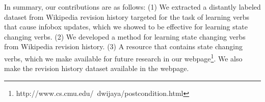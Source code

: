 In summary, our contributions are as follows: (1) We  extracted a  distantly labeled dataset from Wikipedia revision history targeted for the task of  learning verbs that cause  infobox updates, which we showed to be effective for learning state changing verbs.  (2) We developed a method for learning state changing verbs from Wikipedia revision history.
(3) A resource that contains state changing verbs, which we make available for future research in our webpage\footnote{http://www.cs.cmu.edu/~dwijaya/postcondition.html}. We also make the revision history dataset available in the webpage.

